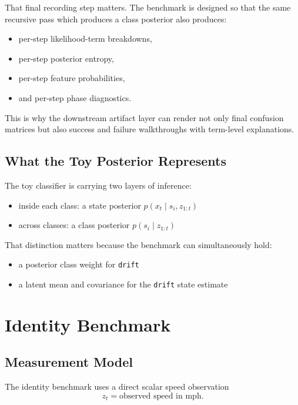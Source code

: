 \documentclass[11pt]{article}
\begin{document}
That final recording step matters. The benchmark is designed so that the same
recursive pass which produces a class posterior also produces:
\begin{itemize}[leftmargin=1.5em]
    \item per-step likelihood-term breakdowns,
    \item per-step posterior entropy,
    \item per-step feature probabilities,
    \item and per-step phase diagnostics.
\end{itemize}

This is why the downstream artifact layer can render not only final confusion
matrices but also success and failure walkthroughs with term-level explanations.

\subsection{What the Toy Posterior Represents}

The toy classifier is carrying two layers of inference:
\begin{itemize}[leftmargin=1.5em]
    \item inside each class: a state posterior $p(x_t \mid s_i, z_{1:t})$
    \item across classes: a class posterior $p(s_i \mid z_{1:t})$
\end{itemize}

That distinction matters because the benchmark can simultaneously hold:
\begin{itemize}[leftmargin=1.5em]
    \item a posterior class weight for \texttt{drift}
    \item a latent mean and covariance for the \texttt{drift} state estimate
\end{itemize}

\section{Identity Benchmark}

\subsection{Measurement Model}

The identity benchmark uses a direct scalar speed observation
\begin{equation}
    z_t = \text{observed speed in mph}.
\end{equation}
\end{document}
